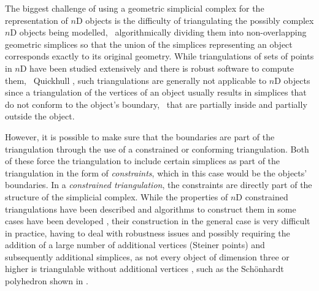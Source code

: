 The biggest challenge of using a geometric simplicial complex for the representation of $n$D objects is the difficulty of triangulating the possibly complex $n$D objects being modelled, \ie\ algorithmically dividing them into non-overlapping geometric simplices so that the union of the simplices representing an object corresponds exactly to its original geometry.
While triangulations of sets of points in $n$D have been studied extensively and there is robust software to compute them, \eg\ Quickhull \citep{Barber96}, such triangulations are generally not applicable to $n$D objects since a triangulation of the vertices of an object usually results in simplices that do not conform to the object's boundary, \ie\ that are partially inside and partially outside the object.

However, it is possible to make sure that the boundaries are part of the triangulation through the use of a constrained or conforming triangulation.
Both of these force the triangulation to include certain simplices as part of the triangulation in the form of \emph{constraints}, which in this case would be the objects' boundaries.
In a \emph{constrained triangulation}, the constraints are directly part of the structure of the simplicial complex.
While the properties of $n$D constrained triangulations have been described \citep{Shewchuk07} and algorithms to construct them in some cases have been developed \citep{Shewchuk00}, their construction in the general case is very difficult in practice, having to deal with robustness issues and possibly requiring the addition of a large number of additional vertices (Steiner points) and subsequently additional simplices, as not every object of dimension three or higher is triangulable without additional vertices \citep{Ruppert92}, such as the Sch\"onhardt polyhedron shown in .
